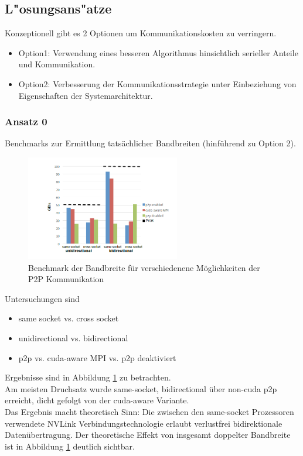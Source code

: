 \subsection{L"osungsans"atze}
Konzeptionell gibt es 2 Optionen um Kommunikationskosten zu verringern.
\begin{itemize}
	\item Option1: Verwendung eines besseren Algorithmus hinsichtlich serieller Anteile und Kommunikation.
	\item Option2: Verbesserung der Kommunikationsstrategie unter Einbeziehung von Eigenschaften der Systemarchitektur.
\end{itemize}

\subsubsection{Ansatz 0}
Benchmarks zur Ermittlung tatsächlicher Bandbreiten (hinführend zu Option 2).
\begin{figure}
\centering
\includegraphics[width=0.6\textwidth]{res/bench0.png}
\caption{\cite[Abb. 4]{mainpaper} Benchmark der Bandbreite für verschiedenene Möglichkeiten der P2P Kommunikation}
	\label{fig:bench0}
\end{figure}
Untersuchungen sind
\begin{itemize}
	\item same socket vs. cross socket
	\item unidirectional vs. bidirectional
	\item p2p vs. cuda-aware MPI vs. p2p deaktiviert
\end{itemize}
Ergebnisse sind in Abbildung \ref{fig:bench0} zu betrachten.\\
Am meisten Druchsatz wurde same-socket, bidirectional über non-cuda p2p erreicht, dicht gefolgt von der cuda-aware Variante.\\
Das Ergebnis macht theoretisch Sinn: Die zwischen den same-socket Prozessoren verwendete NVLink Verbindungstechnologie erlaubt verlustfrei bidirektionale Datenübertragung. Der theoretische Effekt von insgesamt doppelter Bandbreite ist in Abbildung \ref{fig:bench0} deutlich sichtbar.\\


